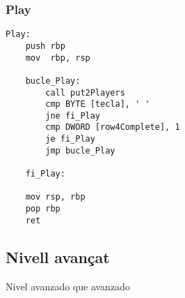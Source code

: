 \documentclass[a4paper,12pt]{article}
\begin{document}
\subsubsection{Play}
\begin{lstlisting}[firstnumber=880]
Play:
	push rbp
	mov  rbp, rsp

	bucle_Play:
		call put2Players
		cmp BYTE [tecla], ' '
		jne fi_Play
		cmp DWORD [row4Complete], 1
		je fi_Play
		jmp bucle_Play
		
	fi_Play:

	mov rsp, rbp
	pop rbp
	ret

\end{lstlisting}
\subsection{Nivell avançat}
Nivel avanzado que avanzado
\end{document}
